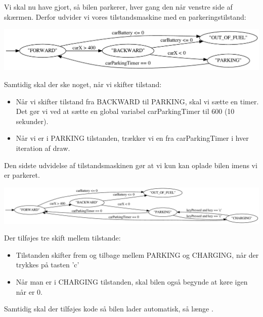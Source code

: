 \documentclass{ucph-handout}
\begin{document}
\newpage
\begin{exercisebox}[adjusted title=Udvidet tilstandsmaskine]
Vi skal nu have gjort, så bilen parkerer, hver gang den når venstre side
af skærmen. Derfor udvider vi vores tilstandsmaskine med en
parkeringstilstand:
\begin{center}
\includegraphics[width=1\textwidth]{../illustrations/graphviz/carStateMachine_parking}
\end{center}

\noindent
Samtidig skal der ske noget, når vi skifter tilstand:
\begin{itemize}
\item Når vi skifter tilstand fra BACKWARD til PARKING, skal vi sætte
  en timer. Det gør vi ved at sætte en global variabel carParkingTimer
  til 600 (10 sekunder).
\item Når vi er i PARKING tilstanden, trækker vi en fra carParkingTimer
  i hver iteration af draw.
\end{itemize}
\end{exercisebox}

\begin{exercisebox}[adjusted title=Kun opladning når der er parkeret]
Den sidste udvidelse af tilstandsmaskinen gør at vi kun kan oplade
bilen imens vi er parkeret.

\hspace{-3cm}
\includegraphics[width=1.4\textwidth]{../illustrations/graphviz/carStateMachine_charging}

\noindent
Der tilføjes tre skift mellem tilstande:
\begin{itemize}
\item Tilstanden skifter frem og tilbage mellem PARKING og CHARGING,
  når der trykkes på tasten 'c'
\item Når man er i CHARGING tilstanden, skal bilen også begynde at
  køre igen når  er 0.
\end{itemize}

\noindent
Samtidig skal der tilføjes kode så bilen lader automatisk, så længe
.
\end{exercisebox}
\end{document}
